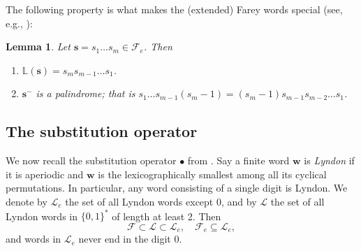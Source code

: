 \documentclass[12pt]{amsart}
\newtheorem{lemma}[theorem]{Lemma}
\theoremstyle{definition}
\theoremstyle{remark}
\numberwithin{equation}{section}
\renewcommand{\L}{\ensuremath{\mathbb{L}}}
\newcommand{\cF}{\mathcal{F}}
\newcommand{\cL}{\mathcal{L}}
\newcommand{\s}{ {\mathbf{s}}}
\newcommand{\w}{\mathbf{w}}
\begin{document}
{The following property is what makes the (extended) Farey words special (see, e.g., \cite[Proposition 2.5]{Carminati-Isola-Tiozzo-2018}):

\begin{lemma} \label{lem:Farey-property}
Let $\s=s_1\ldots s_m\in\cF_e$. Then
\begin{enumerate}[{\rm (i)}]
\item $\L(\s)=s_ms_{m-1}\ldots s_1$.
\item ${\s^-}$ is a palindrome; that is $s_1\ldots s_{m-1}(s_m-1)=(s_m-1)s_{m-1}s_{m-2}\ldots s_1$.
\end{enumerate}
\end{lemma}


\subsection{The substitution operator}

We now recall the substitution operator $\bullet$ from \cite{Allaart-Kong-2021}. Say a finite word $\w$ is {\em Lyndon} if it is aperiodic and $\w$ is the lexicographically smallest among all its cyclical permutations. In particular, any word consisting of a single digit is Lyndon. We denote by $\cL_e$ the set of all Lyndon words except $0$, and by $\cL$ the set of all Lyndon words in $\{0,1\}^*$ of length at least 2. Then 
\[
\cF\subset\cL\subset\cL_e,\quad \cF_e\subseteq\cL_e,
\]
and words in $\cL_e$ never end in the digit $0$.

}
\end{document}
